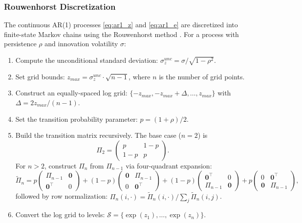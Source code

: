 \documentclass[12pt]{article}
\newcommand{\calS}{\mathcal{S}}
\begin{document}
\subsubsection{Rouwenhorst Discretization}

The continuous AR(1) processes \eqref{eq:ar1_z} and \eqref{eq:ar1_e} are discretized into finite-state Markov chains using the Rouwenhorst method \citep{kopeckysuen2010}. For a process with persistence $\rho$ and innovation volatility $\sigma$:

\begin{enumerate}[label=\textit{Step \arabic*.}]
  \item Compute the unconditional standard deviation: $\sigma_z^{unc} = \sigma / \sqrt{1 - \rho^2}$.
  \item Set grid bounds: $z_{max} = \sigma_z^{unc} \cdot \sqrt{n-1}$, where $n$ is the number of grid points.
  \item Construct an equally-spaced log grid: $\{-z_{max}, -z_{max} + \Delta, \ldots, z_{max}\}$ with $\Delta = 2 z_{max}/(n-1)$.
  \item Set the transition probability parameter: $p = (1 + \rho)/2$.
  \item Build the transition matrix recursively. The base case ($n = 2$) is
  \begin{equation}\label{eq:rouwenhorst_base}
    \Pi_2 = \begin{pmatrix} p & 1-p \\ 1-p & p \end{pmatrix}.
  \end{equation}
  For $n > 2$, construct $\Pi_n$ from $\Pi_{n-1}$ via four-quadrant expansion:
  \begin{equation}\label{eq:rouwenhorst_recursion}
    \widetilde{\Pi}_n = p \begin{pmatrix} \Pi_{n-1} & \mathbf{0} \\ \mathbf{0}^\top & 0 \end{pmatrix}
    + (1-p) \begin{pmatrix} \mathbf{0} & \Pi_{n-1} \\ 0 & \mathbf{0}^\top \end{pmatrix}
    + (1-p) \begin{pmatrix} \mathbf{0}^\top & 0 \\ \Pi_{n-1} & \mathbf{0} \end{pmatrix}
    + p \begin{pmatrix} 0 & \mathbf{0}^\top \\ \mathbf{0} & \Pi_{n-1} \end{pmatrix},
  \end{equation}
  followed by row normalization: $\Pi_n(i, \cdot) = \widetilde{\Pi}_n(i, \cdot) / \sum_j \widetilde{\Pi}_n(i, j)$.
  \item Convert the log grid to levels: $\calS = \{\exp(z_1), \ldots, \exp(z_n)\}$.
\end{enumerate}
\end{document}
